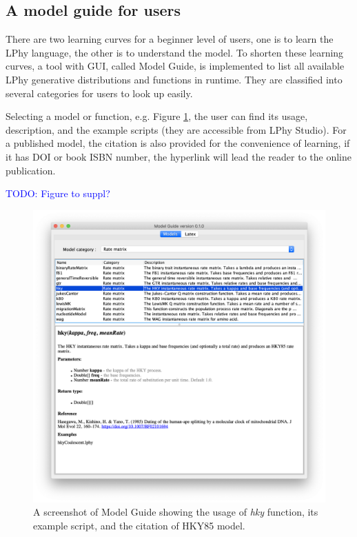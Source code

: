 \documentclass[10pt,letterpaper,table]{article}
\begin{document}
{\subsection{A model guide for users}
There are two learning curves for a beginner level of users, one is to learn the LPhy language, the other is to understand the model. To shorten these learning curves, a tool with GUI, called Model Guide, is implemented to list all available LPhy generative distributions and functions in runtime. 
They are classified into several categories for users to look up easily.

Selecting a model or function, e.g. Figure \ref{fig:modelguide}, the user can find its usage, description, and the example scripts (they are accessible from LPhy Studio). For a published model, the citation is also provided for the convenience of learning, if it has DOI or book ISBN number, the hyperlink will lead the reader to the online publication.   

\textcolor{blue}{TODO: Figure to suppl?}

\begin{figure}
  \includegraphics[width=\textwidth]{figs/modelguide.png}
  \caption{A screenshot of Model Guide showing the usage of \emph{hky} function, its example script, and the citation of HKY85 model.} 
  \label{fig:modelguide}
\end{figure}


}
\end{document}
